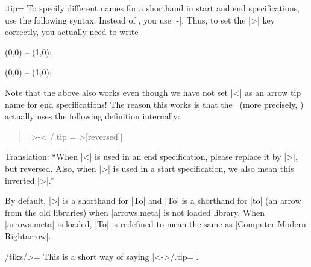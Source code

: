 \begin{handler}{{.tip}{=}}
    To specify different names for a shorthand in start and end specifications,
    use the following syntax: Instead of , you use |-|. Thus, to set the
    |>| key correctly, you actually need to write
\begin{codeexample}[preamble={\usetikzlibrary{arrows.meta}}]
\tikz [<-> /.tip = Stealth] \draw [<->>] (0,0) -- (1,0);
\end{codeexample}
\begin{codeexample}[preamble={\usetikzlibrary{arrows.meta}}]
\tikz [<-> /.tip = Latex] \draw [>-<] (0,0) -- (1,0);
\end{codeexample}

    Note that the above also works even though we have not set |<| as an arrow
    tip name for end specifications! The reason this works is that the
    \tikzname\ (more precisely, \pgfname) actually uses the following
    definition internally:
    \begin{quote}
        |>-< /.tip = >[reversed]|
    \end{quote}
    Translation: ``When |<| is used in an end specification, please replace it
    by |>|, but reversed. Also, when |>| is used in a start specification, we
    also mean this inverted |>|.''

    By default, |>| is a shorthand for |To| and |To| is a shorthand for |to|
    (an arrow from the old libraries) when |arrows.meta| is not loaded library.
    When |arrows.meta| is loaded, |To| is redefined to mean the same as
    |Computer Modern Rightarrow|.
\end{handler}

\begin{key}{/tikz/>=}
    This is a short way of saying |<->/.tip=|.
\begin{codeexample}[preamble={\usetikzlibrary{arrows.meta}}]
\begin{tikzpicture}[scale=2,ultra thick]
  \begin{scope}[>=Latex]
    \draw[>->]    (0pt,3ex) -- (1cm,3ex);
    \draw[|<->>|] (0pt,2ex) -- (1cm,2ex);
  \end{scope}
  \begin{scope}[>=Stealth]
    \draw[>->]    (0pt,1ex) -- (1cm,1ex);
    \draw[|<<.<->|] (0pt,0ex) -- (1cm,0ex);
  \end{scope}
\end{tikzpicture}
\end{codeexample}
\end{key}

